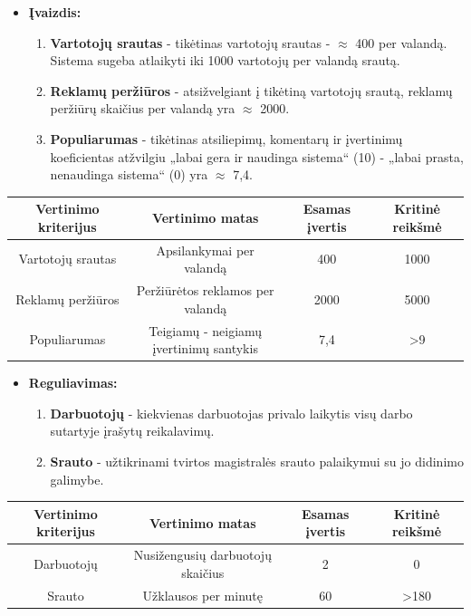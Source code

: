 \documentclass[12pt]{article}
\begin{document}
	\begin{itemize}
	
	\item{\textbf{Įvaizdis:}}
	\begin{enumerate}
		\item{\textbf{Vartotojų srautas} - tikėtinas vartotojų srautas - $\approx$ 400 per valandą. Sistema sugeba atlaikyti iki 1000 vartotojų per valandą srautą.}
		\item{\textbf{Reklamų peržiūros} - atsižvelgiant į tikėtiną vartotojų srautą, reklamų peržiūrų skaičius per valandą yra $\approx$ 2000.}
		\item{\textbf{Populiarumas} - tikėtinas atsiliepimų, komentarų ir įvertinimų koeficientas atžvilgiu „labai gera ir naudinga sistema“ (10) - „labai prasta, nenaudinga sistema“ (0) yra $\approx$ 7,4.}
	\end{enumerate}
	\end{itemize}
	
	\begin{center}
		\begin{tabular}{ | c | c | c | c |}
			\hline
			Vertinimo kriterijus & Vertinimo matas & Esamas įvertis & Kritinė reikšmė \\ \hline 
			Vartotojų srautas & Apsilankymai per valandą & 400 & 1000 \\ \hline
			Reklamų peržiūros & Peržiūrėtos reklamos per valandą & 2000 & 5000 \\ \hline
			Populiarumas & \makecell{Teigiamų - neigiamų \\ įvertinimų santykis} & 7,4 & >9 \\ \hline
		\end{tabular}
	\end{center}
	\pagebreak

	\begin{itemize}

	\item{\textbf{Reguliavimas:}}
	\begin{enumerate}
		\item{\textbf{Darbuotojų} - kiekvienas darbuotojas privalo laikytis visų darbo sutartyje įrašytų reikalavimų.}
		\item{\textbf{Srauto} - užtikrinami tvirtos magistralės srauto palaikymui su jo didinimo galimybe.}
	\end{enumerate}
	\end{itemize}
	
	\begin{center}
		\begin{tabular}{ | c | c | c | c |}
			\hline
			Vertinimo kriterijus & Vertinimo matas & Esamas įvertis & Kritinė reikšmė \\ \hline 
			Darbuotojų & Nusižengusių darbuotojų skaičius & 2 & 0 \\ \hline
			Srauto & Užklausos per minutę & 60 & >180 \\ \hline
		\end{tabular}
	\end{center}
	\pagebreak
\end{document}
